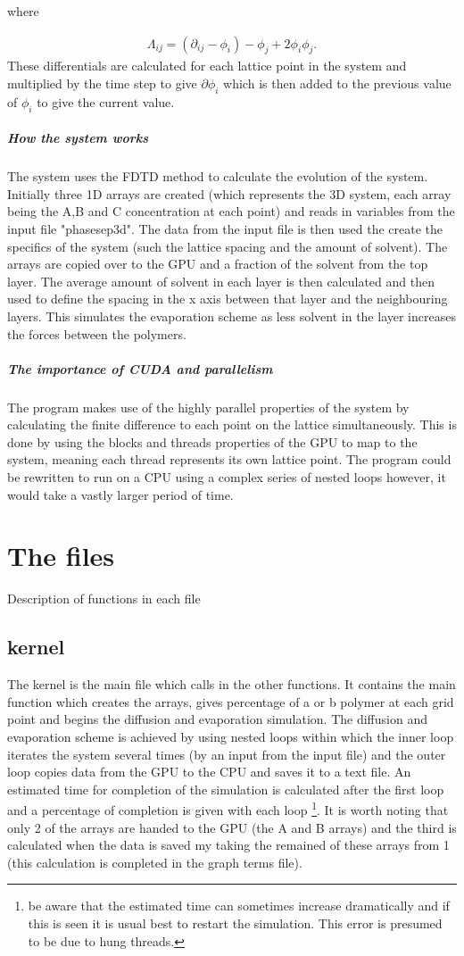 \documentclass{article}
\numberwithin{equation}{section} %
\begin{document}
where

 \begin{align}
\Lambda _{ij} = (\partial _{ij} - \phi _{i})-\phi _{j} + 2\phi _{i} \phi _{j}.
\end{align}
These differentials are calculated for each lattice point in the system and multiplied by the time step to give $\partial \phi _{i}$ which is then added to the previous value of $\phi _{i}$ to give the current value. 


\subparagraph{How the system works}  The system uses the FDTD method to calculate the evolution of the system. Initially three 1D arrays are created (which represents the 3D system, each array being the A,B and C concentration at each point) and reads in variables from the input file "phasesep3d". The data from the input file is then used the create the specifics of the system (such the lattice spacing and the amount of solvent). The arrays are copied over to the GPU and a fraction of the solvent from the top layer. The average amount of solvent in each layer is then calculated and then used to define the spacing in the x axis between that layer and the neighbouring layers. This simulates the evaporation scheme as less solvent in the layer increases the forces between the polymers.   

\subparagraph{The importance of CUDA and parallelism} The program makes use of the highly parallel properties of the system by calculating the finite difference to each point on the lattice simultaneously. This is done by using the blocks and threads properties of the GPU to map to the system, meaning each thread represents its own lattice point. The program could be rewritten to run on a CPU using a complex series of nested loops however, it would take a vastly larger period of time. 


\section{The files} Description of functions in each file

\subsection{kernel} The kernel is the main file which calls in the other functions. It contains the main function which creates the arrays, gives percentage of a or b polymer at each grid point and begins the diffusion and evaporation simulation. The diffusion and evaporation scheme is achieved by using nested loops within which the inner loop iterates the system several times (by an input from the input file) and the outer loop copies data from the GPU to the CPU and saves it to a text file. An estimated time for completion of the simulation is calculated after the first loop and a percentage of completion is given with each loop \footnote{be aware that the estimated time can sometimes increase dramatically and if this is seen it is usual best to restart the simulation. This error is presumed to be due to hung threads.}. It is worth noting that only 2 of the arrays are handed to the GPU (the A and B arrays) and the third is calculated when the data is saved my taking the remained of these arrays from 1 (this calculation is completed in the graph terms file). 
\end{document}
